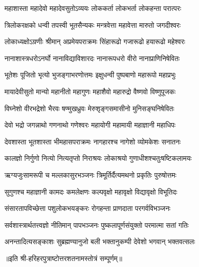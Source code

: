 

\twolineshloka
{महाशास्ता महादेवो महादेवसुतोऽव्ययः}
{लोककर्ता लोकभर्ता लोकहन्ता परात्परः}

\twolineshloka
{त्रिलोकरक्षको धन्वी तपस्वी भूतसैन्यकः}
{मन्त्रवेत्ता महावेत्ता मारुतो जगदीश्वरः}

\twolineshloka
{लोकाध्यक्षोऽग्रणीः श्रीमान् अप्रमेयपराक्रमः}
{सिंहारूढो गजारूढो हयारूढो महेश्वरः}

\twolineshloka
{नानाशास्त्रधरोऽनर्घो नानाविद्याविशारदः}
{नानारूपधरो वीरो नानाप्राणिनिषेवितः}

\twolineshloka
{भूतेशः पूजितो भृत्यो भुजङ्गाभरणोत्तमः}
{इक्षुधन्वी पुष्पबाणो महारूपो महाप्रभुः}

\twolineshloka
{मायादेवीसुतो मान्यो महानीतो महागुणः}
{महाशैवो महारुद्रो वैष्णवो विष्णुपूजकः}

\twolineshloka
{विघ्नेशो वीरभद्रेशो भैरवः षण्मुखध्रुवः}
{मेरुशृङ्गसमासीनो मुनिसङ्घनिषेवितः}

\twolineshloka
{देवो भद्रो जगन्नाथो गणनाथो गणेश्वरः}
{महायोगी महामायी महाज्ञानी महाधिपः}

\twolineshloka
{देवशास्ता भूतशास्ता भीमहासपराक्रमः}
{नागहारश्च नागेशो व्योमकेशः सनातनः}

\twolineshloka
{कालज्ञो निर्गुणो नित्यो नित्यतृप्तो निराश्रयः}
{लोकाश्रयो गुणाधीशश्चतुःषष्टिकलामयः}

\twolineshloka
{ऋग्यजुःसामरूपी च मल्लकासुरभञ्जनः}
{त्रिमूर्तिर्दैत्यमथनो प्रकृतिः पुरुषोत्तमः}

\twolineshloka
{सुगुणश्च महाज्ञानी कामदः कमलेक्षणः}
{कल्पवृक्षो महावृक्षो विद्यावृक्षो विभूतिदः}

\twolineshloka
{संसारतापविच्छेत्ता पशुलोकभयङ्करः}
{रोगहन्ता प्राणदाता परगर्वविभञ्जनः}

\twolineshloka
{सर्वशास्त्रार्थतत्त्वज्ञो नीतिमान् पापभञ्जनः}
{पुष्कलापूर्णसंयुक्तो परमात्मा सतां गतिः}

\twolineshloka
{अनन्तादित्यसङ्काशः सुब्रह्मण्यानुजो बली}
{भक्तानुकम्पी देवेशो भगवान् भक्तवत्सलः}

{॥इति श्री-हरिहरपुत्राष्टोत्तरशतनामस्तोत्रं सम्पूर्णम्॥}
